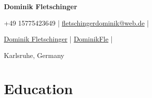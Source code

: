 \documentclass[a4paper,11pt]{article}
\newcommand{\socialicon}[1]{\raisebox{-0.05em}{\resizebox{!}{1em}{#1}}}
\newcommand{\headerfontiii}{\fontfamily{ppl}\selectfont} %
\begin{document}
\headerfontiii

\begin{center}
    {\Huge\textbf{Dominik Fletschinger}}
\end{center}
\vspace{-6mm}

\begin{center}
    \small{
    +49 15775423649   | \href{mailto:fletschingerdominik@web.de}{fletschingerdominik@web.de} | 
    }
\end{center}
\vspace{-6mm}

\begin{center}
    \small{
    \socialicon{\faLinkedin} \href{https://www.linkedin.com/in/dominik-fletschinger-562925262/}{Dominik Fletschinger} | 
    \socialicon{\faGithub} \href{https://github.com/DominikFle}{DominikFle} | 
    }
\end{center}
\vspace{-6mm}
\begin{center}
    \small{Karlsruhe, Germany}
\end{center}

\vspace{-6mm}






\section{\textbf{Education}}
\end{document}
